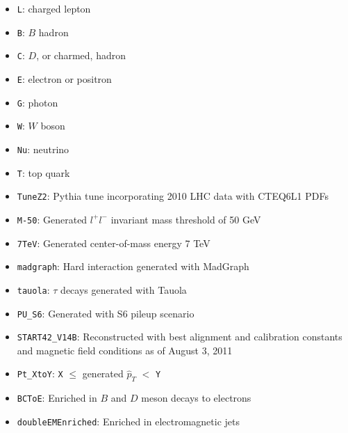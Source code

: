 \documentclass[dissertation.tex]{subfiles}
\begin{document}
\begin{itemize}
\item \verb+L+: charged lepton
\item \verb+B+: $B$ hadron
\item \verb+C+: $D$, or charmed, hadron
\item \verb+E+: electron or positron
\item \verb+G+: photon
\item \verb+W+: $W$ boson
\item \verb+Nu+: neutrino
\item \verb+T+: top quark
\item \verb+TuneZ2+: Pythia tune incorporating 2010 LHC data with CTEQ6L1 \cite{CTEQ6} PDFs \cite{LPCC_MBUE_WG}
\item \verb+M-50+: Generated $l^{+}l^{-}$ invariant mass threshold of 50 GeV
\item \verb+7TeV+: Generated center-of-mass energy 7 TeV
\item \verb+madgraph+: Hard interaction generated with MadGraph \cite{MadGraph}
\item \verb+tauola+: $\tau$ decays generated with Tauola \cite{Tauola}
\item \verb+PU_S6+: Generated with S6 pileup scenario %
\item \verb+START42_V14B+: Reconstructed with best alignment and calibration constants and magnetic field conditions as of August 3, 2011
\item \verb+Pt_XtoY+: \verb+X+ $\leq$ generated $\hat{p}_{T}$ $<$ \verb+Y+
\item \verb+BCToE+: Enriched in $B$ and $D$ meson decays to electrons
\item \verb+doubleEMEnriched+: Enriched in electromagnetic jets %
\end{itemize}
\end{document}
